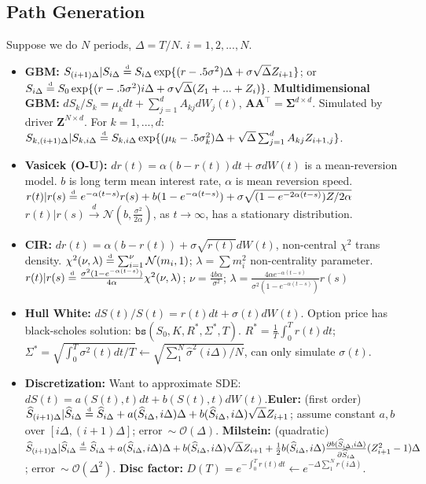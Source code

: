\documentclass[9pt, landscape]{article}
\newcommand\disteq{\stackrel{\mathclap{\normalfont\mbox{\tiny d}}}{=}}
\begin{document}
\begin{multicols*}{3}
\section{Path Generation}
Suppose we do $N$ periods, $\Delta=T/N$. $i=1,2,...,N$.
\begin{itemize}
	\item \textbf{GBM:} $S_{(i+1)\Delta}|S_{i\Delta}\disteq S_{i\Delta}\exp\{(r-.5\sigma^2)\Delta + \sigma \sqrt{\Delta}Z_{i+1}\}$; or $S_{i\Delta}\disteq S_{0}\exp\{(r-.5\sigma^2)i\Delta + \sigma \sqrt{\Delta}(Z_1 + ... + Z_i)\}$. \textbf{Multidimensional GBM:} $dS_k/S_k = \mu_k dt + \sum_{j=1}^d A_{kj}dW_j(t)$, $\bm{A}\bm{A}^{\top}=\bm{\Sigma}^{d\times d}$. Simulated by driver $\bm{Z}^{N\times d}$. For $k=1,...,d$:\\
	 $S_{k,(i+1)\Delta}|S_{k,i\Delta} \disteq S_{k,i\Delta}\exp\{(\mu_k-.5\sigma_k^2)\Delta + \sqrt{\Delta}\sum_{j=1}^d A_{kj}Z_{i+1, j}\}$.
	\item \textbf{Vasicek (O-U):} $dr(t) = \alpha(b-r(t))dt + \sigma dW(t)$ is a mean-reversion model. $b$ is long term mean interest rate, $\alpha$ is mean reversion speed.\\
	$r(t)|r(s) \disteq e^{-\alpha(t-s)}r(s)+b(1-e^{-\alpha(t-s)})+\sigma\sqrt{(1-e^{-2 \alpha(t-s)})Z/2 \alpha}$\\
	$r(t)|r(s) \xrightarrow{d} \mathcal{N}(b, \frac{\sigma^2}{2 \alpha})$, as $t\to \infty$, has a stationary distribution.
	\item \textbf{CIR:} $dr(t)=\alpha(b-r(t)) + \sigma\sqrt{r(t)}dW(t)$, non-central $\chi^2$ trans density. $\chi^2(\nu, \lambda)\disteq \sum_{i=1}^{\nu}\mathcal{N}(m_i, 1)$; $\lambda=\sum m_i^2$ non-centrality parameter.\\
	$r(t)|r(s)\disteq \frac{\sigma^2(1-e^{-\alpha(t-s)})}{4 \alpha}\chi^2(\nu, \lambda)$; $\nu=\frac{4b \alpha}{\sigma^2}$; $\lambda = \frac{4 \alpha e^{-\alpha(t-s)}}{\sigma^2(1-e^{-\alpha(t-s)})}r(s)$
	\item \textbf{Hull White:} $dS(t)/S(t)=r(t)dt + \sigma(t)dW(t)$. Option price has black-scholes solution: $\texttt{bs}(S_0, K, R^*, \Sigma^*, T)$. $R^*=\frac{1}{T}\int_0^Tr(t)dt$; $\Sigma^*=\sqrt{\int_0^T\sigma^2(t)dt/T}\gets \sqrt{\sum_1^N\widehat{\sigma}^2(i\Delta)/N}$, can only simulate $\sigma(t)$.
	\item \textbf{Discretization:} Want to approximate SDE: $dS(t)=a(S(t),t)dt + b(S(t),t)dW(t). $\textbf{Euler:} (first order) $\widehat{S}_{(i+1)\Delta}|\widehat{S}_{i\Delta}\disteq \widehat{S}_{i\Delta} + a(\widehat{S}_{i\Delta}, i\Delta)\Delta + b(\widehat{S}_{i\Delta}, i\Delta)\sqrt{\Delta}Z_{i+1}$; assume constant $a,b$ over $[i\Delta, (i+1)\Delta]$; error$~\sim \mathcal{O}(\Delta)$. \textbf{Milstein:} (quadratic) \\$\widehat{S}_{(i+1)\Delta}|\widehat{S}_{i\Delta}\disteq \widehat{S}_{i\Delta} + a(\widehat{S}_{i\Delta}, i\Delta)\Delta + b(\widehat{S}_{i\Delta}, i\Delta)\sqrt{\Delta}Z_{i+1} + \frac{1}{2}b(\widehat{S}_{i\Delta}, i\Delta)\frac{\partial b(\widehat{S}_{i\Delta}, i\Delta)}{\partial \widehat{S}_{i\Delta}} (Z_{i+1}^2 -1 )\Delta$; error$~\sim \mathcal{O}(\Delta^2)$. \textbf{Disc factor:} $D(T)=e^{-\int_0^Tr(t)dt}\gets e^{-\Delta\sum_1^Nr(i\Delta)}$.
\end{itemize}

\end{multicols*}
\end{document}
